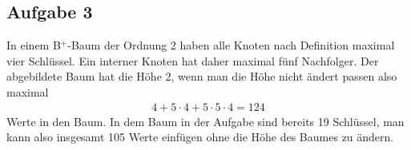 \documentclass[11pt]{article}
\begin{document}
\subsection*{Aufgabe 3}
In einem B$^+$-Baum der Ordnung 2 haben alle Knoten nach Definition maximal vier
Schlüssel. Ein interner Knoten hat daher maximal fünf Nachfolger. Der
abgebildete Baum hat die Höhe 2, wenn man die Höhe nicht ändert passen also
maximal
\begin{align*}
  4 + 5 \cdot 4 + 5 \cdot 5 \cdot 4 = 124
\end{align*}
Werte in den Baum. In dem Baum in der Aufgabe sind bereits 19 Schlüssel, man
kann also insgesamt 105 Werte einfügen ohne die Höhe des Baumes zu ändern.
\end{document}
